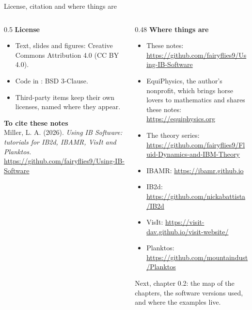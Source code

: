 \documentclass[aspectratio=169,11pt]{beamer}
\begin{document}
\begin{frame}{License, citation and where things are}
\footnotesize
\begin{columns}[T,onlytextwidth]
\begin{column}{0.5\textwidth}
\textbf{License}
\begin{itemize}
  \item Text, slides and figures: Creative Commons Attribution 4.0 (CC BY 4.0).
  \item Code in : BSD 3-Clause.
  \item Third-party items keep their own licenses, named where they appear.
\end{itemize}
\vspace{1mm}
\textbf{To cite these notes}\\
Miller, L. A. (2026). \emph{Using IB Software: tutorials for IB2d, IBAMR, VisIt and Planktos.} \url{https://github.com/fairyflies9/Using-IB-Software}
\end{column}
\begin{column}{0.48\textwidth}
\textbf{Where things are}
\begin{itemize}
  \item These notes: \url{https://github.com/fairyflies9/Using-IB-Software}
  \item EquiPhysics, the author's nonprofit, which brings horse lovers to mathematics and shares these notes: \url{https://equiphysics.org}
  \item The theory series: \url{https://github.com/fairyflies9/Fluid-Dynamics-and-IBM-Theory}
  \item IBAMR: \url{https://ibamr.github.io}
  \item IB2d: \url{https://github.com/nickabattista/IB2d}
  \item VisIt: \url{https://visit-dav.github.io/visit-website/}
  \item Planktos: \url{https://github.com/mountaindust/Planktos}
\end{itemize}
\begin{homebox}
Next, chapter 0.2: the map of the chapters, the software versions used, and where the examples live.
\end{homebox}
\end{column}
\end{columns}
\end{frame}
\end{document}

